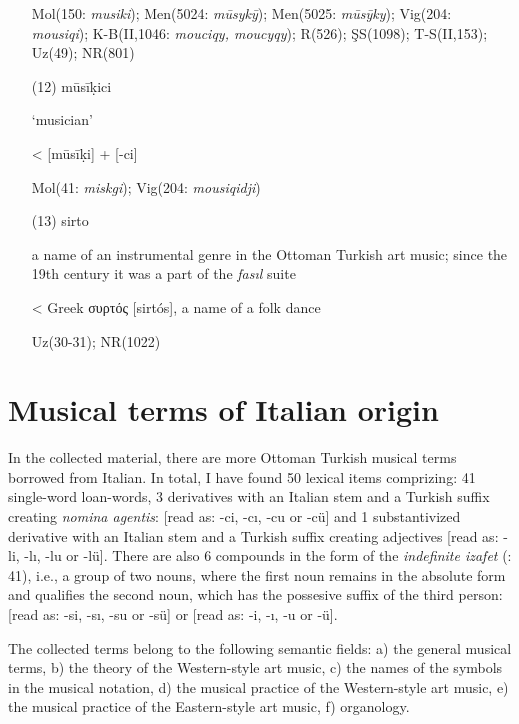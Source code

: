 \documentclass[output=paper,colorlinks,citecolor=brown,arabicfont,chinesefont]{langscibook}
\begin{document}
\begin{itemize}
    Mol(150: \emph{musiki}); Men(5024: \emph{mūsykȳ}); Men(5025: \emph{mūsȳky}); Vig(204: \emph{mousiqi}); K-B(II,1046: \emph{mouciqy, moucyqy}); R(526); ŞS(1098); T-S(II,153); Uz(49); NR(801)

    \item[(12)] mūsīḳici {}

    ‘musician’

    < {} [mūsīḳi] + {} [-ci]

    Mol(41: \emph{miskgi}); Vig(204: \emph{mousiqidji})

    \item[(13)] sirto {}

    a name of an instrumental genre in the Ottoman Turkish art music; since the 19th century it was a part of the \emph{fasıl} suite

    < Greek συρτός [sirtós], a name of a folk dance

    Uz(30-31); NR(1022)
\end{itemize}

\section{Musical terms of Italian origin}\label{sec:pawlina:4}

In the collected material, there are more Ottoman Turkish musical terms borrowed from Italian. In total, I have found 50 lexical items comprizing: 41 single-word loan-words, 3 derivatives with an Italian stem and a Turkish suffix creating \emph{nomina agentis}: {} [read as: -ci, -cı, -cu or -cü] and 1 substantivized derivative with an Italian stem and a Turkish suffix creating adjectives {} [read as: -li, -lı, -lu or -lü]. There are also 6 compounds in the form of the \emph{indefinite izafet} (\citealt{Lewis1991}:  41), i.e., a group of two nouns, where the first noun remains in the absolute form and qualifies the second noun, which has the possesive suffix of the third person: {} [read as: -si, -sı, -su or -sü] or {} [read as: -i, -ı, -u or -ü].

The collected terms belong to the following semantic fields: a) the general musical terms, b) the theory of the Western-style art music, c) the names of the symbols in the musical notation, d) the musical practice of the Western-style art music, e) the musical practice of the Eastern-style art music, f) organology.
\end{document}
